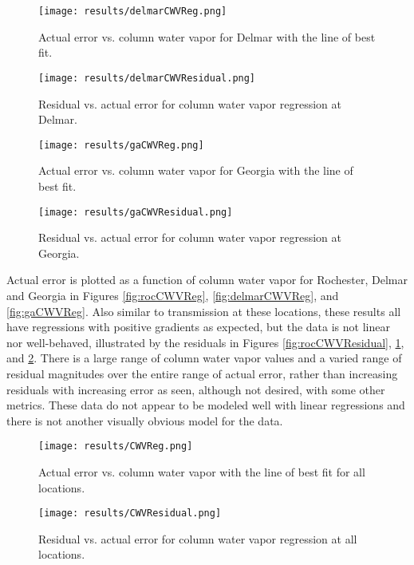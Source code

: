 \documentclass{book}
\begin{document}
\begin{figure}[H]
\begin{minipage}[b]{0.47\textwidth}
\centering
\texttt{[image: results/delmarCWVReg.png]}
\caption{Actual error vs. column water vapor for Delmar with the line of best fit.}
\label{fig:delmarCWVReg}
\end{minipage}
\begin{minipage}[b]{0.47\textwidth}
\centering
\texttt{[image: results/delmarCWVResidual.png]}
\caption{Residual vs. actual error for column water vapor regression at Delmar.}
\label{fig:delmarCWVResidual}
\end{minipage}
\end{figure}

\begin{figure}[H]
\begin{minipage}[b]{0.47\textwidth}
\centering
\texttt{[image: results/gaCWVReg.png]}
\caption{Actual error vs. column water vapor for Georgia with the line of best fit.}
\label{fig:gaCWVReg}
\end{minipage}
\begin{minipage}[b]{0.47\textwidth}
\centering
\texttt{[image: results/gaCWVResidual.png]}
\caption{Residual vs. actual error for column water vapor regression at Georgia.}
\label{fig:gaCWVResidual}
\end{minipage}
\end{figure}

Actual error is plotted as a function of column water vapor for Rochester, Delmar and Georgia in Figures \ref{fig:rocCWVReg}, \ref{fig:delmarCWVReg}, and \ref{fig:gaCWVReg}.  Also similar to transmission at these locations, these results all have regressions with positive gradients as expected, but the data is not linear nor well-behaved, illustrated by the residuals in Figures \ref{fig:rocCWVResidual}, \ref{fig:delmarCWVResidual}, and \ref{fig:gaCWVResidual}.  There is a large range of column water vapor values and a varied range of residual magnitudes over the entire range of actual error, rather than increasing residuals with increasing error as seen, although not desired, with some other metrics.  These data do not appear to be modeled well with linear regressions and there is not another visually obvious model for the data.

\begin{figure}[H]
\begin{minipage}[b]{0.47\textwidth}
\centering
\texttt{[image: results/CWVReg.png]}
\caption{Actual error vs. column water vapor with the line of best fit for all locations.}
\label{fig:CWVReg}
\end{minipage}
\begin{minipage}[b]{0.47\textwidth}
\centering
\texttt{[image: results/CWVResidual.png]}
\caption{Residual vs. actual error for column water vapor regression at all locations.}
\label{fig:CWVResidual}
\end{minipage}
\end{figure}
\end{document}
